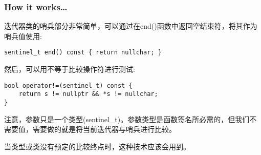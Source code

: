 \subsubsection{How it works…}

迭代器类的哨兵部分非常简单，可以通过在end()函数中返回空结束符，将其作为哨兵值使用:

\begin{lstlisting}[style=styleCXX]
sentinel_t end() const { return nullchar; }
\end{lstlisting}

然后，可以用不等于比较操作符进行测试:

\begin{lstlisting}[style=styleCXX]
bool operator!=(sentinel_t) const {
	return s != nullptr && *s != nullchar;
}
\end{lstlisting}


注意，参数只是一个类型(sentinel\_t)。参数类型是函数签名所必需的，但我们不需要值，需要做的就是将当前迭代器与哨兵进行比较。

当类型或类没有预定的比较终点时，这种技术应该会用到。




















